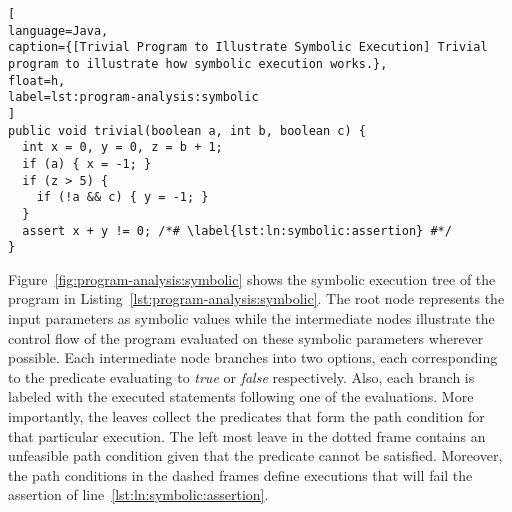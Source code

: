 \begin{lstlisting}[
language=Java,
caption={[Trivial Program to Illustrate Symbolic Execution] Trivial program to illustrate how symbolic execution works.},
float=h,
label=lst:program-analysis:symbolic
]
public void trivial(boolean a, int b, boolean c) {
  int x = 0, y = 0, z = b + 1;
  if (a) { x = -1; }
  if (z > 5) {
    if (!a && c) { y = -1; }
  }
  assert x + y != 0; /*# \label{lst:ln:symbolic:assertion} #*/
}
\end{lstlisting}

Figure~\ref{fig:program-analysis:symbolic} shows the symbolic execution tree of the program in Listing~\ref{lst:program-analysis:symbolic}. The root node represents the input parameters as symbolic values while the intermediate nodes illustrate the control flow of the program evaluated on these symbolic parameters wherever possible. Each intermediate node branches into two options, each corresponding to the predicate evaluating to \textit{true} or \textit{false} respectively. Also, each branch is labeled with the executed statements following one of the evaluations. More importantly, the leaves collect the predicates that form the path condition for that particular execution. The left most leave in the dotted frame contains an unfeasible path condition given that the predicate cannot be satisfied. Moreover, the path conditions in the dashed frames define executions that will fail the assertion of line~\ref{lst:ln:symbolic:assertion}.

